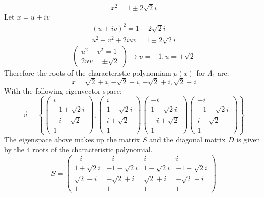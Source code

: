 \begin{equation}
    x^2 = 1 \pm 2\sqrt{2}i
\end{equation}
Let $x = u + iv$
\begin{eqnarray}
    (u + iv)^2 = 1 \pm 2\sqrt{2}i \\
     u^2 - v^2 + 2iuv = 1 \pm 2\sqrt{2}i 
\end{eqnarray}
\begin{equation}
    \begin{pmatrix} u ^2  - v^2  =1 \\ 2uv = \pm \sqrt{2} \end{pmatrix} \rightarrow v = \pm 1 , u = \pm \sqrt{2}
\end{equation}
Therefore the roots of the characteristic polynomiam $p(x)$ for $\Lambda_{1}$ are:
\begin{equation}
    x = \sqrt{2} + i, -\sqrt{2} - i, -\sqrt{2} + i, \sqrt{2} - i
\end{equation}
With the following eigenvector space:
\begin{equation}
    \Vec{v} = \left\{   \begin{pmatrix} i \\ -1+ \sqrt{2}i \\ -i - \sqrt{2} \\ 1 \end{pmatrix} , 
    \begin{pmatrix}
    i \\ 1  - \sqrt{2}i \\ i + \sqrt{2} \\ 1 \end{pmatrix}
    \begin{pmatrix}
    -i \\ 1 + \sqrt{2}i \\ -i + \sqrt{2} \\ 1 \end{pmatrix}
    \begin{pmatrix}
    - i \\ -1 - \sqrt{2}i \\ i - \sqrt{2} \\ 1 \end{pmatrix}
    \right\}
\end{equation}
The eigenspace above makes up the matrix $S$ and the diagonal matrix $D$ is given by the 4 roots of the characteristic polynomial.
\begin{equation}
    S = \begin{pmatrix}
    -i & -i& i & i \\
    1+\sqrt{2}i & -1 - \sqrt{2}i & 1 - \sqrt{2}i & -1 + \sqrt{2}i \\
    \sqrt{2} - i & - \sqrt{2} + i & \sqrt{2} + i & -\sqrt{2} - i \\
    1 & 1 & 1 & 1 \end{pmatrix}
\end{equation}
